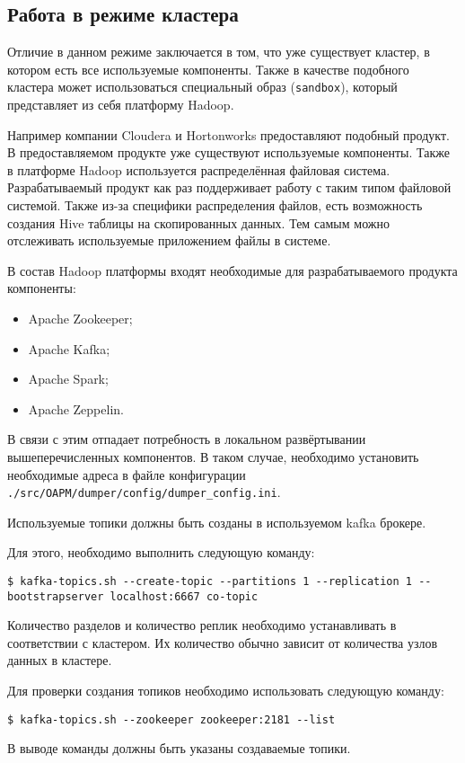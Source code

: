 \subsection{Работа в режиме кластера}

Отличие в данном режиме заключается в том, что уже существует кластер, в котором есть все используемые компоненты.
Также в качестве подобного кластера может использоваться специальный образ (\texttt{sandbox}), который представляет из себя платформу Hadoop.

Например компании Cloudera и Hortonworks предоставляют подобный продукт.
В предоставляемом продукте уже существуют используемые компоненты.
Также в платформе Hadoop используется распределённая файловая система.
Разрабатываемый продукт как раз поддерживает работу с таким типом файловой системой.
Также из-за специфики распределения файлов, есть возможность создания Hive таблицы на скопированных данных.
Тем самым можно отслеживать используемые приложением файлы в системе.

В состав Hadoop платформы входят необходимые для разрабатываемого продукта компоненты:
\begin{itemize}
    \item Apache Zookeeper;
    \item Apache Kafka;
    \item Apache Spark;
    \item Apache Zeppelin.
\end{itemize}

В связи с этим отпадает потребность в локальном развёртывании вышеперечисленных компонентов.
В таком случае, необходимо установить необходимые адреса в файле конфигурации \texttt{./src/OAPM/dumper/config/dumper\_config.ini}.

Используемые топики должны быть созданы в используемом kafka брокере.

Для этого, необходимо выполнить следующую команду:
\begin{lstlisting}    
$ kafka-topics.sh --create-topic --partitions 1 --replication 1 --bootstrapserver localhost:6667 co-topic
\end{lstlisting}
Количество разделов и количество реплик необходимо устанавливать в соответствии с кластером.
Их количество обычно зависит от количества узлов данных в кластере.

Для проверки создания топиков необходимо использовать следующую команду:
\begin{lstlisting}
$ kafka-topics.sh --zookeeper zookeeper:2181 --list
\end{lstlisting}
В выводе команды должны быть указаны создаваемые топики.

